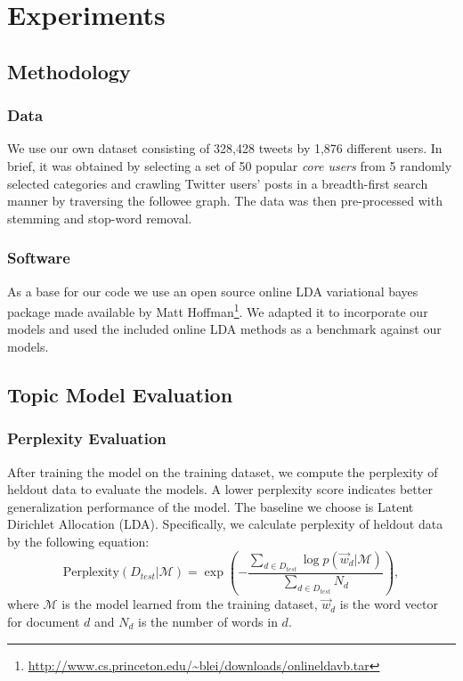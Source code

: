 \section{Experiments}
%
\subsection{Methodology}\label{sec:methodology}
%
\subsubsection{Data}\label{sec:data}
%
We use our own dataset consisting of 328,428 tweets by 1,876 different users. In brief, it was obtained by selecting a set of 50 popular \textit{core users} from 5 randomly selected categories and crawling Twitter users' posts in a breadth-first search manner by traversing the followee graph. The data was then pre-processed with stemming and stop-word removal.
%
\subsubsection{Software}\label{sec:code}
%
As a base for our code we use an open source online LDA variational bayes package made available by Matt Hoffman\footnote{\url{http://www.cs.princeton.edu/~blei/downloads/onlineldavb.tar}}. We adapted it to incorporate our models and used the included online LDA methods as a benchmark against our models.
%
\subsection{Topic Model Evaluation}
\subsubsection{Perplexity Evaluation}
%
%
%
After training the model on the training dataset, we compute the perplexity of heldout data to evaluate the models.
%
A lower perplexity score indicates better generalization performance of the model. The baseline we choose is Latent Dirichlet Allocation (LDA). Specifically, we calculate perplexity of heldout data by the following equation:
%
\vspace{-1mm}
%
\begin{equation}
	\textrm{Perplexity}({D}_{test}|\mathcal{M})=\exp(-\frac{{\sum}_{d\in D_{test}} \log p(\overrightarrow{w}_{d}|\mathcal{M})}{{\sum}_{d\in D_{test}} N_d}),
\end{equation}
%
\noindent where $\mathcal{M}$ is the model learned from the training dataset, $\overrightarrow{w}_{d}$ is the word vector for document $d$ and $N_d$ is the number of words in $d$.
%
